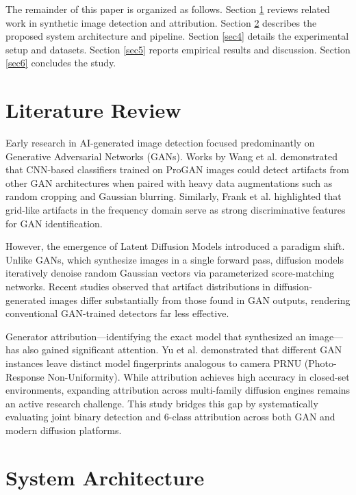 \documentclass[pdflatex,sn-mathphys-num]{sn-jnl}
\theoremstyle{thmstyleone}
\theoremstyle{thmstyletwo}
\theoremstyle{thmstylethree}
\begin{document}
The remainder of this paper is organized as follows. Section \ref{sec2} reviews related work in synthetic image detection and attribution. Section \ref{sec3} describes the proposed system architecture and pipeline. Section \ref{sec4} details the experimental setup and datasets. Section \ref{sec5} reports empirical results and discussion. Section \ref{sec6} concludes the study.

\section{Literature Review}\label{sec2}

Early research in AI-generated image detection focused predominantly on Generative Adversarial Networks (GANs). Works by Wang et al. \cite{wang2020cnn} demonstrated that CNN-based classifiers trained on ProGAN images could detect artifacts from other GAN architectures when paired with heavy data augmentations such as random cropping and Gaussian blurring. Similarly, Frank et al. \cite{frank2020wavelet} highlighted that grid-like artifacts in the frequency domain serve as strong discriminative features for GAN identification.

However, the emergence of Latent Diffusion Models \cite{stablediffusion2022} introduced a paradigm shift. Unlike GANs, which synthesize images in a single forward pass, diffusion models iteratively denoise random Gaussian vectors via parameterized score-matching networks. Recent studies \cite{corvi2023detection, ojha2023towards} observed that artifact distributions in diffusion-generated images differ substantially from those found in GAN outputs, rendering conventional GAN-trained detectors far less effective.

Generator attribution—identifying the exact model that synthesized an image—has also gained significant attention. Yu et al. \cite{yu2019attribution} demonstrated that different GAN instances leave distinct model fingerprints analogous to camera PRNU (Photo-Response Non-Uniformity). While attribution achieves high accuracy in closed-set environments, expanding attribution across multi-family diffusion engines remains an active research challenge. This study bridges this gap by systematically evaluating joint binary detection and 6-class attribution across both GAN and modern diffusion platforms.

\section{System Architecture}\label{sec3}
\end{document}
